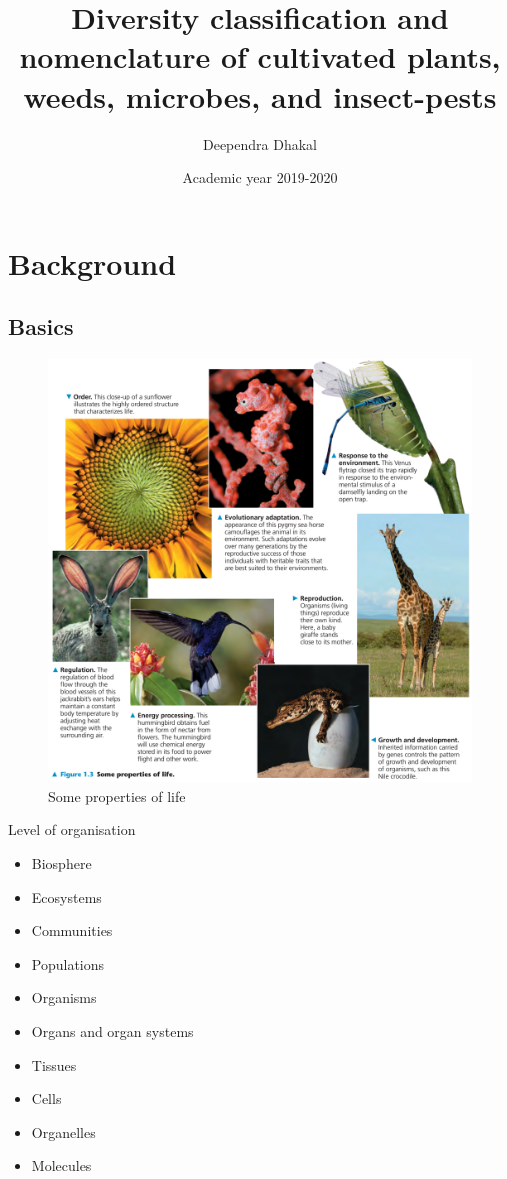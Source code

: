 \documentclass[ignorenonframetext,aspectratio=169]{beamer}
\title{Diversity classification and nomenclature of cultivated plants, weeds,
microbes, and insect-pests}
\author{Deependra Dhakal}
\institute{GAASC, Baitadi \and Tribhuwan University}
\date{Academic year 2019-2020}
\providecommand{\tightlist}{%
  \setlength{\itemsep}{0pt}\setlength{\parskip}{0pt}}
\begin{document}
\frame{\titlepage}

\begin{frame}
\tableofcontents[hideallsubsections]
\end{frame}
\hypertarget{background}{%
\section{Background}\label{background}}

\hypertarget{basics}{%
\subsection{Basics}\label{basics}}

\begin{frame}{}
\protect\hypertarget{section}{}

\begin{figure}
\includegraphics[width=0.46\linewidth]{./../images/properties_of_life} \caption{Some properties of life}\label{fig:properties-life}
\end{figure}

\end{frame}

\begin{frame}{Level of organisation}
\protect\hypertarget{level-of-organisation}{}

\begin{itemize}
\tightlist
\item
  Biosphere
\item
  Ecosystems
\item
  Communities
\item
  Populations
\item
  Organisms
\item
  Organs and organ systems
\item
  Tissues
\item
  Cells
\item
  Organelles
\item
  Molecules
\end{itemize}

\end{frame}
\end{document}
